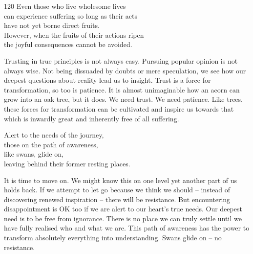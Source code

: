 
\begin{dhpVerse}{120}
\label{dhp-120}
Even those who live wholesome lives\\
can experience suffering so long as their acts\\
have not yet borne direct fruits.\\
However, when the fruits of their actions ripen\\
the joyful consequences cannot be avoided.
\end{dhpVerse}

\begin{dhpRefl}

Trusting in true principles is not always easy. Pursuing popular
opinion is not always wise. Not being dissuaded by doubts or mere
speculation, we see how our deepest questions about reality lead us
to insight. Trust is a force for transformation, so too is patience.
It is almost unimaginable how an acorn can grow into an oak tree, but
it does. We need trust. We need patience. Like trees, these forces
for transformation can be cultivated and inspire us towards that
which is inwardly great and inherently free of all suffering.

\end{dhpRefl}


\begin{dhpVerse}{91}
\label{dhp-91}
Alert to the needs of the journey,\\
those on the path of awareness,\\
like swans, glide on,\\
leaving behind their former resting places.
\end{dhpVerse}

\begin{dhpRefl}

It is time to move on. We might know this on one level yet another
part of us holds back. If we attempt to let go because we think we
should -- instead of discovering renewed inspiration -- there will be
resistance. But encountering disappointment is OK too if we are alert
to our heart's true needs. Our deepest need is to be free from
ignorance. There is no place we can truly settle until we have fully
realised who and what we are. This path of awareness has the power to
transform absolutely everything into understanding. Swans glide on --
no resistance.

\end{dhpRefl}

